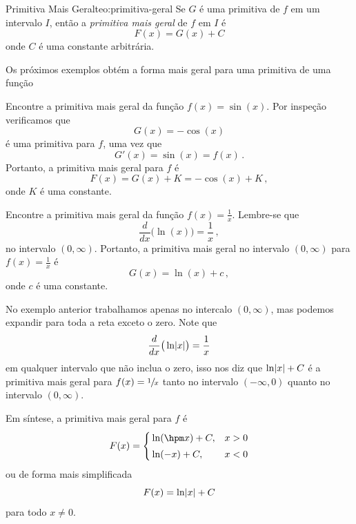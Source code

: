 \begin{teorema}{Primitiva Mais Geral}{teo:primitiva-geral}
  Se $G$ é uma primitiva de $f$ em um intervalo $I$, então a
  \emph{primitiva mais geral}
  de $f$ em $I$ é
  \[
    F(x) = G(x) + C
  \]
  onde $C$ é uma constante arbitrária.
\end{teorema}
Os próximos exemplos obtém a forma mais geral para uma primitiva de uma função

\begin{example}
  Encontre a primitiva mais geral da função \(f(x)= \sin(x)\).
  \solution
  Por inspeção verificamos que
  \[
    G(x) = -\cos(x)
  \]
  é uma primitiva para $f$, uma vez que
  \[
    G'(x) = \sin(x) = f(x) \,.
  \]
  Portanto, a primitiva mais geral para $f$ é
  \[
    F(x) = G(x) + K = -\cos(x) + K \,,
  \]
  onde $K$ é uma constante.
\end{example}

\begin{example}
  Encontre a primitiva mais geral da função \(f(x)= \frac{1}{x}\).
  \solution
  Lembre-se que
  \[
    \frac{d}{dx} \big(\ln(x) \big) = \frac{1}{x} \,,
  \]
  no intervalo $(0, \infty)$.
  Portanto, a primitiva mais geral no intervalo $(0, \infty)$
  para
  \(f(x)=\frac{1}{x}\)
  é
  \[
    G(x)=\ln(x)+c \,,
  \]
  onde $c$ é uma constante.
\end{example}

No exemplo anterior trabalhamos apenas no intercalo $(0, \infty)$,
mas podemos expandir para toda a reta exceto o zero.
Note que
\[
    \frac{d}{dx}\big(\ln\abs{x}\big) = \frac{1}{x}
\]
em qualquer intervalo que não inclua o zero, isso nos diz que
\(\ln\abs{x}+ C\)
é a primitiva mais geral para
\(f(x)= \sfrac{1}{x}\)
tanto no intervalo $(-\infty,0)$ quanto no intervalo $(0, \infty)$.

Em síntese, a primitiva mais geral para $f$ é
\[
F(x)
= \begin{cases}
    \,\ln(\hpm x) + C, & x > 0 \\[1mm]
    \,\ln(   - x) + C, & x < 0
  \end{cases}
\]
ou de forma mais simplificada
\begin{equation}
  \label{eq:prmitiva_ln}
  F(x) = \ln\abs{x} + C
\end{equation}
para todo $x \neq 0$.

